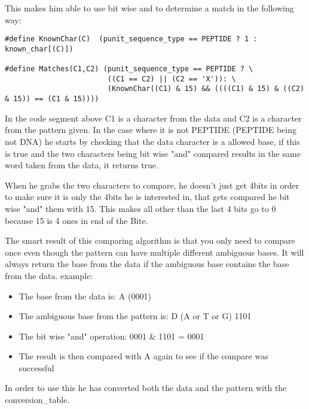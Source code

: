 \documentclass[12pt]{article}
\begin{document}
This makes him able to use bit wise and to determine a match in the following way:
\begin{lstlisting}
#define KnownChar(C)  (punit_sequence_type == PEPTIDE ? 1 : known_char[(C)])

#define Matches(C1,C2) (punit_sequence_type == PEPTIDE ? \
                        ((C1 == C2) || (C2 == 'X')): \
                        (KnownChar((C1) & 15) && ((((C1) & 15) & ((C2) & 15)) == (C1 & 15))))

\end{lstlisting}
In the code segment above C1 is a character from the data and C2 is a character from the pattern given. In the case where it is not PEPTIDE (PEPTIDE being not DNA) he starts by checking that the data character is a allowed base, if this is true and the two characters being bit wise "and" compared results in the same word taken from the data, it returns true. 

When he grabs the two characters to compare, he doesn't just get 4bits in order to make sure it is only the 4bits he is interested in, that gets compared he bit wise "and" them with 15. This makes all other than the last 4 bits go to 0 because 15 is 4 ones in end of the Bite.

The smart result of this comparing algorithm is that you only need to compare once even though the pattern can have multiple different ambiguous bases. It will always return the base from the data if the ambiguous base contains the base from the data. example: \\
\begin{itemize}
\item The base from the data is: A (0001)
\item The ambiguous base from the pattern is: D (A or T or G) 1101
\item The bit wise "and" operation: 0001 \& 1101 = 0001
\item The result is then compared with A again to see if the compare was successful
\end{itemize}
 
In order to use this he has converted both the data and the pattern with the conversion\_table. \\
\end{document}
